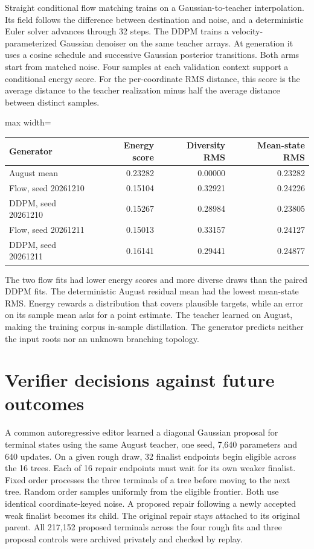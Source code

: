\documentclass[11pt,oneside,openany]{book}
\begin{document}
Straight conditional flow matching trains on a Gaussian-to-teacher interpolation. Its field follows the difference between destination and noise, and a deterministic Euler solver advances through 32 steps. The DDPM trains a velocity-parameterized Gaussian denoiser on the same teacher arrays. At generation it uses a cosine schedule and successive Gaussian posterior transitions. Both arms start from matched noise. Four samples at each validation context support a conditional energy score. For the per-coordinate RMS distance, this score is the average distance to the teacher realization minus half the average distance between distinct samples.

\begin{center}\footnotesize\sffamily\setlength{\tabcolsep}{3.5pt}\renewcommand{\arraystretch}{1.2}
\begin{adjustbox}{max width=\linewidth}\begin{tabular}{@{}lrrr@{}}\toprule
Generator  & Energy score  & Diversity RMS  & Mean-state RMS \\ \midrule
August mean  & 0.23282  & 0.00000  & 0.23282 \\
Flow, seed 20261210  & 0.15104  & 0.32921  & 0.24226 \\
DDPM, seed 20261210  & 0.15267  & 0.28984  & 0.23805 \\
Flow, seed 20261211  & 0.15013  & 0.33157  & 0.24127 \\
DDPM, seed 20261211  & 0.16141  & 0.29441  & 0.24877 \\
\bottomrule\end{tabular}\end{adjustbox}\end{center}
The two flow fits had lower energy scores and more diverse draws than the paired DDPM fits. The deterministic August residual mean had the lowest mean-state RMS. Energy rewards a distribution that covers plausible targets, while an error on its sample mean asks for a point estimate. The teacher learned on August, making the training corpus in-sample distillation. The generator predicts neither the input roots nor an unknown branching topology.

\section*{Verifier decisions against future outcomes}
A common autoregressive editor learned a diagonal Gaussian proposal for terminal states using the same August teacher, one seed, 7,640 parameters and 640 updates. On a given rough draw, 32 finalist endpoints begin eligible across the 16 trees. Each of 16 repair endpoints must wait for its own weaker finalist. Fixed order processes the three terminals of a tree before moving to the next tree. Random order samples uniformly from the eligible frontier. Both use identical coordinate-keyed noise. A proposed repair following a newly accepted weak finalist becomes its child. The original repair stays attached to its original parent. All 217,152 proposed terminals across the four rough fits and three proposal controls were archived privately and checked by replay.
\end{document}
